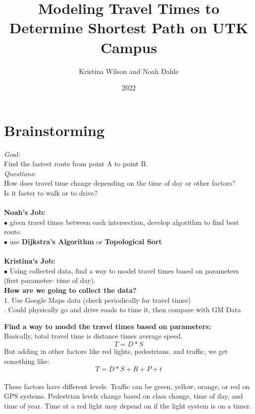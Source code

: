 \documentclass{article}
\title{Modeling Travel Times to Determine Shortest Path on UTK Campus}
\author{Kristina Wilson and Noah Dahle}
\date{2022}
\begin{document}
\maketitle
\begin{centering}\tableofcontents\end{centering}

\newpage
\section{Brainstorming}

\textit{Goal:} \\ Find the fastest route from point A to point B. \\
\textit{Questions:} \\
How does travel time change depending on the time of day or other factors? \\
Is it faster to walk or to drive? \\
 \\ 
\textbf{Noah's Job:} \\
\indent $\bullet$ given travel times between each intersection, develop algorithm to find best route. \\
\indent $\bullet$ use \textbf{Dijkstra's Algorithm} or \textbf{Topological Sort} \\
\\

\noindent\textbf{Kristina's Job:} \\
\indent $\bullet$ Using collected data, find a way to model travel times based on parameters (first parameter- time of day). \\

\noindent\textbf{How are we going to collect the data?} \\
\indent\textit{}{ 1. Use Google Maps data (check periodically for travel times)}\\
. Could physically go and drive roads to time it, then compare with GM Data \\

\vspace{0.1in}

\textbf{Find a way to model the travel times based on parameters: }\\
Basically, total travel time is distance times average speed. 
$$ T = D*S$$ 
But adding in other factors like red lights, pedestrians, and traffic, we get something like:
$$ T = D*S + R + P + t $$ 
\\
These factors have different levels. Traffic can be green, yellow, orange, or red on GPS systems. Pedestrian levels change based on class change, time of day, and time of year. Time at a red light may depend on if the light system is on a timer. 
\\
\end{document}
